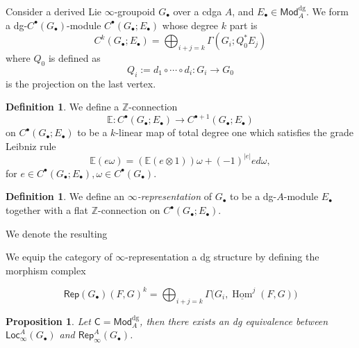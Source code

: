 \documentclass[12pt]{amsart}
\newtheorem{prop}[thm]{Proposition}
\theoremstyle{definition}
\newtheorem{defn}[thm]{Definition}
\theoremstyle{remark}
\numberwithin{equation}{section}
\newcommand{\CC}{{\mathsf C}}
\newcommand{\BE}{{\mathbb E}}
\newcommand{\Z}{{\mathbb{Z}}}
\newcommand{\1}{{\mathbb{1}}}
\newcommand{\Mod}{\mathsf{Mod}}
\newcommand{\rep}{\mathsf{Rep}}
\newcommand{\Loc}{\mathsf{Loc}}
\newcommand{\bt}{\bullet}
\newcommand{\dg}{{\operatorname{dg}}}
\newcommand{\HOM}{\underline{\operatorname{Hom}}}
\begin{document}
    

    Consider a derived Lie $\infty$-groupoid $G_{\bt}$ over a cdga $A$, and $E_{\bt}\in \Mod_A^{\dg}$. We form a dg-$C^{\bt}(G_{\bt})$-module $C^{\bt}(G_{\bt}; E_{\bt})$ whose degree $k$ part is 
    \begin{equation}
        C^k(G_{\bt}; E_{\bt}) = \bigoplus_{i+j = k}\Gamma(G_i;Q_0^*E_j)
    \end{equation}
    where $Q_0$ is defined as 
    $$
    Q_i := d_{1}\circ\cdots\circ d_i: G_i \to G_0
$$ is the projection on the last vertex. 
\begin{defn}
    We define a $\Z$-connection $$
    \BE: C^{\bt}(G_{\bt}; E_{\bt}) \to C^{\bt + 1}(G_{\bt}; E_{\bt})$$
    on $C^{\bt}(G_{\bt}; E_{\bt})$ to be a $k$-linear map of total degree one  which satisfies the grade Leibniz rule
    \begin{equation*}
        \mathbb{E}(e\omega) = (\mathbb{E}(e\otimes 1))\omega + (-1)^{|e|}ed\omega,
    \end{equation*}
    for $e\in C^{\bt}(G_{\bt}; E_{\bt}), \omega \in C^{\bt}(G_{\bt})$. 
\end{defn}

\begin{defn}
    We define an {\it $\infty$-representation} of $G_{\bt}$ to be a dg-$A$-module $E_{\bt}$ together with a flat $\Z$-connection on $C^{\bt}(G_{\bt}; E_{\bt})$.
\end{defn}
    We denote the resulting
    
We equip the category of $\infty$-representation a dg structure by defining the morphism complex
    
    \begin{equation*}
        \rep(G_{\bt})(F, G)^k = \bigoplus_{i+j = k} \Gamma\big(G_i, \HOM^j(F,G)\big)
    \end{equation*}
\begin{prop}
    Let $\CC = \Mod_A^{\dg}$, then there exists an dg equivalence  between $\Loc_{\infty}^{A}(G_{\bt})$ and $\rep^A_{\infty}(G_{\bt})$.
\end{prop}
\end{document}
